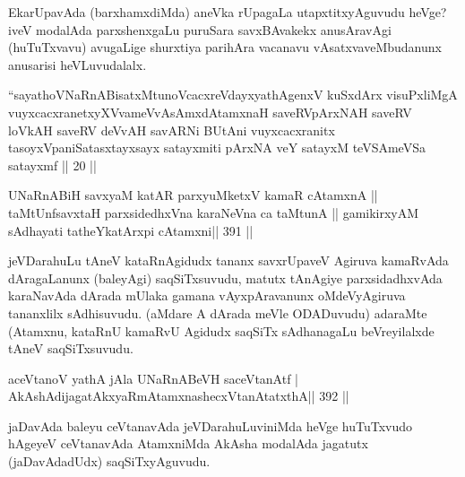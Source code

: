 \begin{artha}
EkarUpavAda (barxhamxdiMda) aneVka rUpagaLa utapxtitxyAguvudu heVge?  \mdash  iveV modalAda parxshenxgaLu puruSara savxBAvakekx anusAravAgi (huTuTxvavu) avugaLige shurxtiya parihAra vacanavu vAsatxvaveMbudanunx anusarisi heVLuvudalalx.
\end{artha}


\begin{kandikeshl}
``sayathoVNaRnABisatxMtunoVcacxreVdayxyathAgenxV 
kuSxdArx visuPxliMgA vuyxcacxranetxyXVvameVvAsAmxdAtamxnaH 
saveRVpArxNAH saveRV loVkAH saveRV deVvAH savARNi
BUtAni vuyxcacxranitx tasoyxVpaniSatasxtayxsayx
satayxmiti pArxNA veY satayxM teVSAmeVSa satayxmf || 20 ||
\end{kandikeshl}

\begin{center}
 \end{center}
 
\begin{shl}
UNaRnABiH savxyaM katAR parxyuMketxV kamaR cA\s\s tamxnA ||
taMtUnfsavxtaH parxsidedhxVna karaNeVna ca taMtunA ||
gamikirxyAM sAdhayati tatheYkatArxpi cA\s\s tamxni\hfill || 391 ||
\end{shl}

\begin{artha}
jeVDarahuLu tAneV kataRnAgidudx tananx savxrUpaveV Agiruva kamaRvAda  dAragaLanunx  (baleyAgi) saqSiTxsuvudu, matutx tAnAgiye parxsidadhxvAda  karaNavAda dArada mUlaka gamana vAyxpAravanunx oMdeVyAgiruva tananxlilx  sAdhisuvudu. (aMdare A dArada meVle ODADuvudu) adaraMte (Atamxnu, kataRnU kamaRvU Agidudx saqSiTx sAdhanagaLu beVreyilalxde tAneV saqSiTxsuvudu.
\end{artha}


\begin{shl}
aceVtanoV yathA jAla UNaRnABeVH saceVtanAtf |
AkAshAdijagatAkxyaRmAtamxnashecxVtanAtatxthA\hfill || 392 ||
\end{shl}

\begin{artha}
jaDavAda baleyu ceVtanavAda jeVDarahuLuviniMda heVge huTuTxvudo hAgeyeV ceVtanavAda AtamxniMda AkAsha modalAda jagatutx (jaDavAdadUdx) saqSiTxyAguvudu.
\end{artha}

